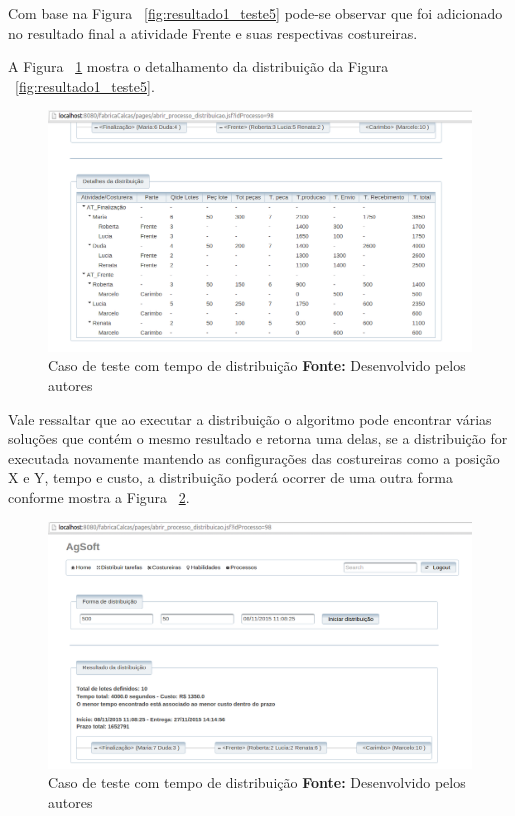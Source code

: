 \par Com base na Figura ~\ref{fig:resultado1_teste5} pode-se observar que foi
adicionado no resultado final a atividade Frente e suas respectivas costureiras.

\par A Figura ~\ref{fig:detalhamento1_teste5} mostra o detalhamento da
distribuição da Figura ~\ref{fig:resultado1_teste5}.

\begin{figure}[h!]
	\centerline{\includegraphics[scale=0.3]{./imagens/detalhamento1_teste5.png}}
	\caption[Caso de teste com tempo de distribuição]
	{Caso de teste com tempo de distribuição \textbf{Fonte:} Desenvolvido pelos autores}
	\label{fig:detalhamento1_teste5}
\end{figure}

\par Vale ressaltar que ao executar a distribuição o algoritmo pode
encontrar várias soluções que contém o mesmo resultado e retorna uma delas, se a
distribuição for executada novamente mantendo as configurações das costureiras
como a posição X e Y, tempo e custo, a distribuição poderá ocorrer de uma outra
forma conforme mostra a Figura ~\ref{fig:resultado2_teste5}.

\newpage

\begin{figure}[h!]
	\centerline{\includegraphics[scale=0.3]{./imagens/resultado2_teste5.png}}
	\caption[Caso de teste com tempo de distribuição]
	{Caso de teste com tempo de distribuição \textbf{Fonte:} Desenvolvido pelos autores}
	\label{fig:resultado2_teste5}
\end{figure}


